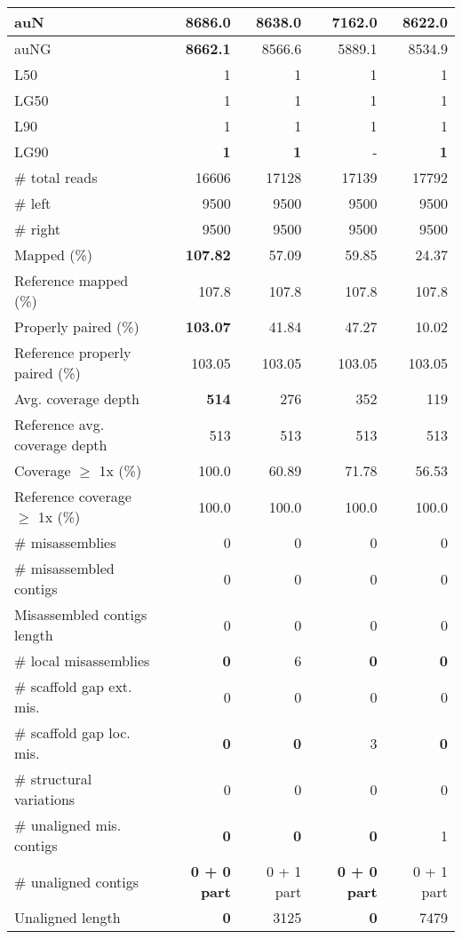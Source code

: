 \documentclass[12pt,a4paper]{article}
\begin{document}
\begin{table}[ht]
\begin{center}
\begin{tabular}{|l*{4}{|r}|}
auN & {\bf 8686.0} & 8638.0 & 7162.0 & 8622.0 \\ \hline
auNG & {\bf 8662.1} & 8566.6 & 5889.1 & 8534.9 \\ \hline
L50 & 1 & 1 & 1 & 1 \\ \hline
LG50 & 1 & 1 & 1 & 1 \\ \hline
L90 & 1 & 1 & 1 & 1 \\ \hline
LG90 & {\bf 1} & {\bf 1} & - & {\bf 1} \\ \hline
\# total reads & 16606 & 17128 & 17139 & 17792 \\ \hline
\# left & 9500 & 9500 & 9500 & 9500 \\ \hline
\# right & 9500 & 9500 & 9500 & 9500 \\ \hline
Mapped (\%) & {\bf 107.82} & 57.09 & 59.85 & 24.37 \\ \hline
Reference mapped (\%) & 107.8 & 107.8 & 107.8 & 107.8 \\ \hline
Properly paired (\%) & {\bf 103.07} & 41.84 & 47.27 & 10.02 \\ \hline
Reference properly paired (\%) & 103.05 & 103.05 & 103.05 & 103.05 \\ \hline
Avg. coverage depth & {\bf 514} & 276 & 352 & 119 \\ \hline
Reference avg. coverage depth & 513 & 513 & 513 & 513 \\ \hline
Coverage $\geq$ 1x (\%) & 100.0 & 60.89 & 71.78 & 56.53 \\ \hline
Reference coverage $\geq$ 1x (\%) & 100.0 & 100.0 & 100.0 & 100.0 \\ \hline
\# misassemblies & 0 & 0 & 0 & 0 \\ \hline
\# misassembled contigs & 0 & 0 & 0 & 0 \\ \hline
Misassembled contigs length & 0 & 0 & 0 & 0 \\ \hline
\# local misassemblies & {\bf 0} & 6 & {\bf 0} & {\bf 0} \\ \hline
\# scaffold gap ext. mis. & 0 & 0 & 0 & 0 \\ \hline
\# scaffold gap loc. mis. & {\bf 0} & {\bf 0} & 3 & {\bf 0} \\ \hline
\# structural variations & 0 & 0 & 0 & 0 \\ \hline
\# unaligned mis. contigs & {\bf 0} & {\bf 0} & {\bf 0} & 1 \\ \hline
\# unaligned contigs & {\bf 0 + 0 part} & 0 + 1 part & {\bf 0 + 0 part} & 0 + 1 part \\ \hline
Unaligned length & {\bf 0} & 3125 & {\bf 0} & 7479 \\ \hline

\end{tabular}
\end{center}
\end{table}
\end{document}
